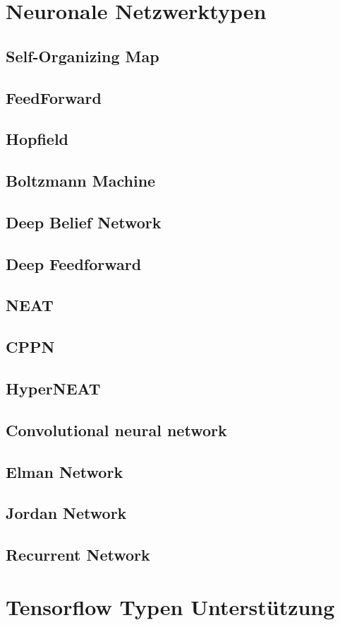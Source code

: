 
\section{Neuronale Netzwerktypen}

\subsection{Self-Organizing Map}

\subsection{FeedForward}

\subsection{Hopfield}

\subsection{Boltzmann Machine}

\subsection{Deep Belief Network}

\subsection{Deep Feedforward}

\subsection{NEAT}

\subsection{CPPN}

\subsection{HyperNEAT}

\subsection{Convolutional neural network}

\subsection{Elman Network}

\subsection{Jordan Network}

\subsection{Recurrent Network}

\section{Tensorflow Typen Unterstützung}
